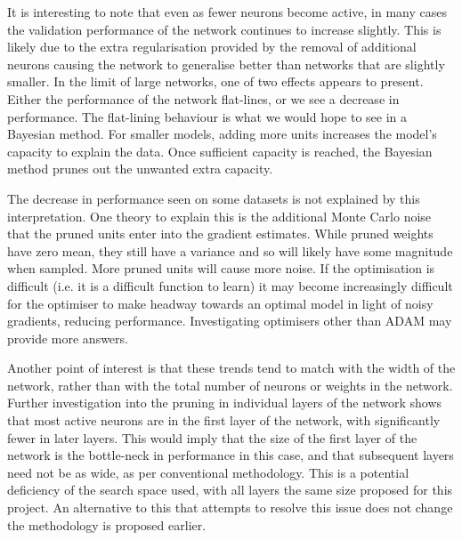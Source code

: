 It is interesting to note that even as fewer neurons become active, in many cases the validation performance of the network continues to increase slightly. This is likely due to the extra regularisation provided by the removal of additional neurons causing the network to generalise better than networks that are slightly smaller. In the limit of large networks, one of two effects appears to present. Either the performance of the network flat-lines, or we see a decrease in performance. The flat-lining behaviour is what we would hope to see in a Bayesian method. For smaller models, adding more units increases the model's capacity to explain the data. Once sufficient capacity is reached, the Bayesian method prunes out the unwanted extra capacity. 

The decrease in performance seen on some datasets is not explained by this interpretation. One theory to explain this is the additional Monte Carlo noise that the pruned units enter into the gradient estimates. While pruned weights have zero mean, they still have a variance and so will likely have some magnitude when sampled. More pruned units will cause more noise. If the optimisation is difficult (i.e. it is a difficult function to learn) it may become increasingly difficult for the optimiser to make headway towards an optimal model in light of noisy gradients, reducing performance. Investigating optimisers other than ADAM may provide more answers.
	
Another point of interest is that these trends tend to match with the width of the network, rather than with the total number of neurons or weights in the network. Further investigation into the pruning in individual layers of the network shows that most active neurons are in the first layer of the network, with significantly fewer in later layers. This would imply that the size of the first layer of the network is the bottle-neck in performance in this case, and that subsequent layers need not be as wide, as per conventional methodology. This is a potential deficiency of the search space  used, with all layers the same size proposed for this project. An alternative to this that attempts to resolve this issue does not change the methodology is proposed earlier.

